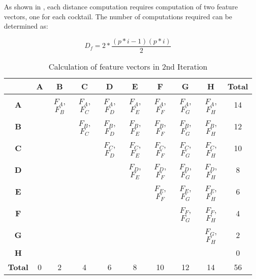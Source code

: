 As shown in , each distance computation requires computation of two feature vectors, one for each cocktail.
The number of computations required can be determined as:

\begin{equation}
D_f = 2 * \frac{(p*i - 1)(p*i)}{2} \label{eq}
\end{equation}


\begin{table}[htbp]
\begin{center}
\caption{Calculation of feature vectors in 2nd Iteration}
\begin{tabular}{|c|c|c|c|c|c|c|c|c|c|}
\hline
 & \textbf{A} & \textbf{B} & \textbf{C} & \textbf{D} & \textbf{E} & \textbf{F} & \textbf{G} & \textbf{H} & \textbf{Total} \\
\hline
\textbf{A} &  & $F_{A}$, $F_{B}$ & $F_{A}$, $F_{C}$ & $F_{A}$, $F_{D}$ & $F_{A}$, $F_{E}$ & $F_{A}$, $F_{F}$ & $F_{A}$, $F_{G}$ & $F_{A}$, $F_{H}$  & 14 \\
\hline
\textbf{B} &  &  & $F_{B}$, $F_{C}$ & $F_{B}$, $F_{D}$ & $F_{B}$, $F_{E}$  & $F_{B}$, $F_{F}$  & $F_{B}$, $F_{G}$  & $F_{B}$, $F_{H}$  & 12 \\
\hline
\textbf{C} &  &  &  & $F_{C}$, $F_{D}$ & $F_{C}$, $F_{E}$  & $F_{C}$, $F_{F}$  & $F_{C}$, $F_{G}$  & $F_{C}$, $F_{H}$  & 10 \\
\hline
\textbf{D} &  &  &  &   & $F_{D}$, $F_{E}$  & $F_{D}$, $F_{F}$  & $F_{D}$, $F_{G}$  & $F_{D}$, $F_{H}$  & 8 \\
\hline
\textbf{E} &  &  &  &   & & $F_{E}$, $F_{F}$  & $F_{E}$, $F_{G}$  & $F_{E}$, $F_{H}$  & 6 \\
\hline
\textbf{F} &  &  &  &   &  & & $F_{F}$, $F_{G}$  & $F_{F}$, $F_{H}$  & 4 \\
\hline
\textbf{G} &  &  &  &   & & &  & $F_{G}$, $F_{H}$  & 2 \\
\hline
\textbf{H} &  &  &  &   & & & & & 0 \\
\hline
\textbf{Total} & 0 & 2 & 4 & 6 & 8 & 10 & 12 & 14 & 56 \\
\hline
\end{tabular}
\label{iteration_2_methodology_table2}
\end{center}
\end{table}


